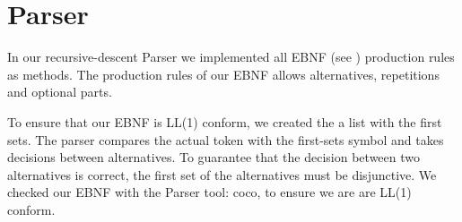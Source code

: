 \section{Parser}

In our recursive-descent Parser we implemented all EBNF (see \label{labelEBNF}) production rules as
methods. The production rules of our EBNF allows alternatives, repetitions and optional parts.

To ensure that our EBNF is LL(1) conform, we created the a list with the first sets.
The parser compares the actual token with the first-sets symbol
and takes decisions between alternatives. 
To guarantee that the decision between two alternatives is correct, the first
set of the alternatives must be disjunctive. We checked our EBNF with the Parser tool: coco, to ensure we are are LL(1) conform.



